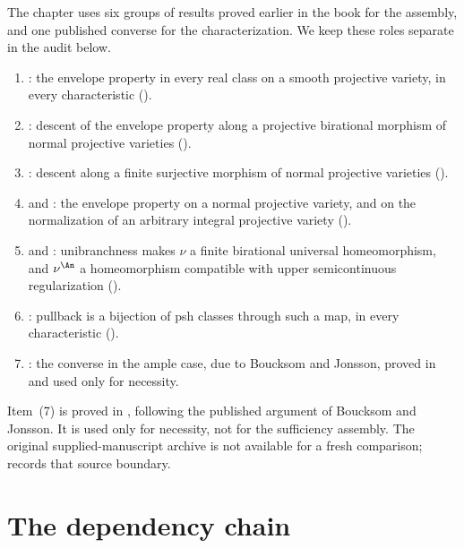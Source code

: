 The chapter uses six groups of results proved earlier in the book for the
assembly, and one published converse for the characterization.  We keep
these roles separate in the audit below.

\begin{enumerate}
\item {}: the envelope property in every real
      class on a smooth projective variety, in every characteristic
      ().
\item {}: descent of the envelope property
      along a projective birational morphism of normal projective varieties
      ().
\item {}: descent along a finite surjective
      morphism of normal projective varieties
      ().
\item {} and
      : the envelope property on a
      normal projective variety, and on the normalization of an arbitrary
      integral projective variety ().
\item {} and
      : unibranchness makes $\nu$ a finite
      birational universal homeomorphism, and $\nu^{\An}$ a homeomorphism
      compatible with upper semicontinuous regularization
      ().
\item {}: pullback is a
      bijection of psh classes through such a map, in every characteristic
      ().
\item {}: the converse in the ample case, due
      to Boucksom and Jonsson, proved in
       and used only for necessity.
\end{enumerate}

Item~(7) is proved in , following the
published argument of Boucksom and Jonsson.  It is used only for necessity,
not for the sufficiency assembly.  The original supplied-manuscript archive
is not available for a fresh comparison;  records that
source boundary.

\section{The dependency chain}
\label{sec:ch45-dependency}

